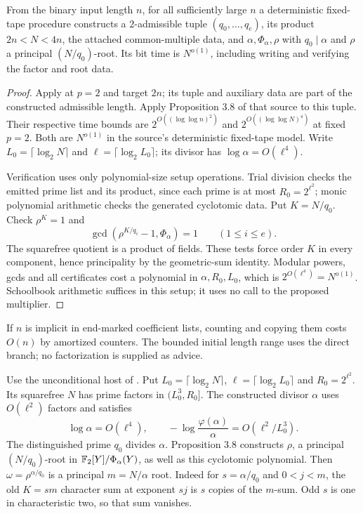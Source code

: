 \begin{lemma}
\label{lem:host-initialization}
From the binary input length $n$, for all sufficiently large $n$ a
deterministic fixed-tape procedure constructs a $2$-admissible tuple
$(q_0,\ldots,q_e)$, its product $2n<N<4n$, the attached common-multiple
data, and $\alpha,\Phi_\alpha,\rho$ with $q_0\mid\alpha$ and
$\rho$ a principal $(N/q_0)$-root. Its bit time is $N^{o(1)}$,
including writing and verifying the factor and root data.
\end{lemma}
\begin{proof}
Apply \cite[Proposition 3.4]{host} at $p=2$ and target $2n$;
its tuple and auxiliary data are part of the constructed admissible
length. Apply Proposition 3.8 of that source to this tuple. Their
respective time bounds are
$2^{O((\log\log n)^2)}$ and $2^{O((\log\log N)^4)}$ at fixed $p=2$.
Both are $N^{o(1)}$ in the source's deterministic fixed-tape model.
Write $L_0=\lceil\log_2N\rceil$ and
$\ell=\lceil\log_2L_0\rceil$; its divisor has
$\log\alpha=O(\ell^4)$.

Verification uses only polynomial-size setup operations. Trial division
checks the emitted prime list and its product, since each prime is at
most $R_0=2^{\ell^2}$; monic polynomial arithmetic checks the generated
cyclotomic data. Put $K=N/q_0$. Check $\rho^K=1$ and
\[
 \gcd(\rho^{K/q_i}-1,\Phi_\alpha)=1\qquad(1\le i\le e).
\]
The squarefree quotient is a product of fields. These tests force
order $K$ in every component, hence principality by the geometric-sum
identity. Modular powers, gcds and all certificates cost a polynomial
in $\alpha,R_0,L_0$, which is $2^{O(\ell^4)}=N^{o(1)}$.
Schoolbook arithmetic suffices in this setup; it uses no call to the
proposed multiplier.
\end{proof}

If $n$ is implicit in end-marked coefficient lists, counting and copying
them costs $O(n)$ by amortized counters. The bounded initial length
range uses the direct branch; no factorization is supplied as advice.

Use the unconditional host of \cite{host}. Put
$L_0=\lceil\log_2N\rceil$, $\ell=\lceil\log_2L_0\rceil$ and
$R_0=2^{\ell^2}$. Its squarefree $N$ has prime factors in
$(L_0^3,R_0]$. The constructed divisor $\alpha$ uses $O(\ell^2)$
factors and satisfies
\[
 \log\alpha=O(\ell^4),\qquad
 -\log\frac{\varphi(\alpha)}\alpha=O(\ell^2/L_0^3).
\]
The distinguished prime $q_0$ divides $\alpha$. Proposition 3.8
constructs $\rho$, a principal $(N/q_0)$-root in
$\mathbb F_2[Y]/\Phi_\alpha(Y)$, as well as this cyclotomic polynomial.
Then $\omega=\rho^{\alpha/q_0}$ is a principal $m=N/\alpha$ root.
Indeed for $s=\alpha/q_0$ and $0<j<m$, the old $K=sm$ character sum
at exponent $sj$ is $s$ copies of the $m$-sum. Odd $s$ is one in
characteristic two, so that sum vanishes.

